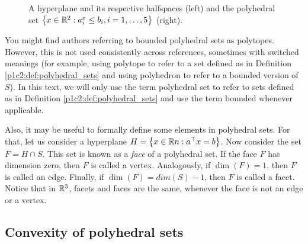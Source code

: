 \begin{figure}[h]
			\vspace{1pt}
		\caption{A hyperplane and its respective halfspaces (left) and the polyhedral set $\left\{ x\in \mathbb{R}^{2} : a_i^x \leq b_i, i =1,\dots, 5 \right \}$ (right).} \label{p1c2:fig:hyperplanes_and_polyhedral_set}		
	\end{figure}

You might find authors referring to bounded polyhedral sets as polytopes. However, this is not used consistently across references, sometimes with switched meanings (for example, using polytope to refer to a set defined as in Definition \ref{p1c2:def:polyhedral_sets} and using polyhedron to refer to a bounded version of $S$). In this text, we will only use the term polyhedral set to refer to sets defined as in Definition \ref{p1c2:def:polyhedral_sets} and use the term bounded whenever applicable.

Also, it may be useful to formally define some elements in polyhedral sets. For that, let us consider a hyperplane $H = \left\{ x \in \mathbb{R}{n} : a^\top x = b \right \}$. Now consider the set $F = H \cap S$. This set is known as a \emph{face} of a polyhedral set. If the face $F$ has dimension zero, then $F$ is called a vertex. Analogously, if $\dim(F)=1$, then $F$ is called an edge. Finally, if $\dim(F) = dim(S)-1$, then $F$ is called a facet. Notice that in $\mathbb{R}^3$, facets and faces are the same, whenever the face is not an edge or a vertex. 


\subsection{Convexity of polyhedral sets}

